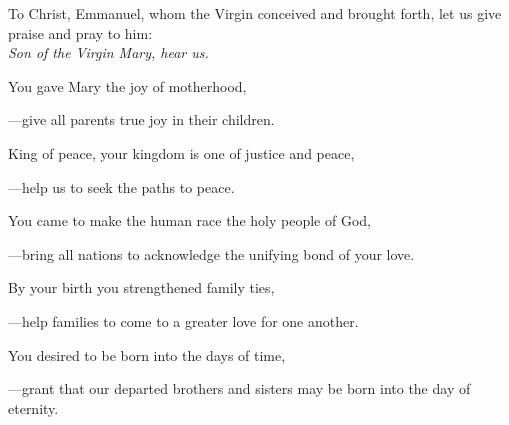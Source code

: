 \intercessions\indent

\begin{hangpar}

To Christ, Emmanuel, whom the Virgin conceived and brought forth, let us give praise and pray to him:\\
\emph{Son of the Virgin Mary, hear us.}

\medskip You gave Mary the joy of motherhood,

{\color{red}---\thinspace}give all parents true joy in their children.

\medskip King of peace, your kingdom is one of justice and peace,

{\color{red}---\thinspace}help us to seek the paths to peace.

\medskip You came to make the human race the holy people of God,

{\color{red}---\thinspace}bring all nations to acknowledge the unifying bond of your love.

\medskip By your birth you strengthened family ties,

{\color{red}---\thinspace}help families to come to a greater love for one another.

\medskip You desired to be born into the days of time,

{\color{red}---\thinspace}grant that our departed brothers and sisters may be born into the day of eternity.

\medskip

\end{hangpar}